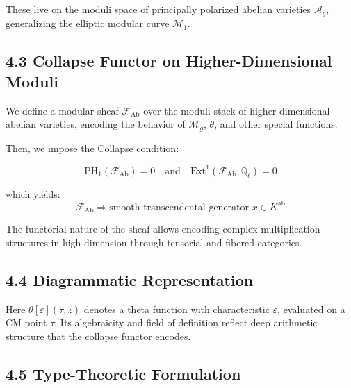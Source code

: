\documentclass[11pt]{article}
\begin{document}
These live on the moduli space of principally polarized abelian varieties \( \mathcal{A}_g \), generalizing the elliptic modular curve \( \mathcal{M}_1 \).

\subsection{4.3 Collapse Functor on Higher-Dimensional Moduli}

We define a modular sheaf \( \mathcal{F}_{\mathrm{Ab}} \) over the moduli stack of higher-dimensional abelian varieties, encoding the behavior of \( \mathcal{M}_g \), \( \theta \), and other special functions.

Then, we impose the Collapse condition:

\[
\boxed{
\mathrm{PH}_1(\mathcal{F}_{\mathrm{Ab}}) = 0 \quad \text{and} \quad \mathrm{Ext}^1(\mathcal{F}_{\mathrm{Ab}}, \mathbb{Q}_\ell) = 0
}
\]

which yields:
\[
\mathcal{F}_{\mathrm{Ab}} \Rightarrow \text{smooth transcendental generator } x \in K^{\mathrm{ab}}
\]

The functorial nature of the sheaf allows encoding complex multiplication structures in high dimension through tensorial and fibered categories.

\subsection{4.4 Diagrammatic Representation}

\begin{center}
\end{center}


Here \( \theta[\varepsilon](\tau, z) \) denotes a theta function with characteristic \( \varepsilon \), evaluated on a CM point \( \tau \).  
Its algebraicity and field of definition reflect deep arithmetic structure that the collapse functor encodes.

\subsection{4.5 Type-Theoretic Formulation}
\end{document}
